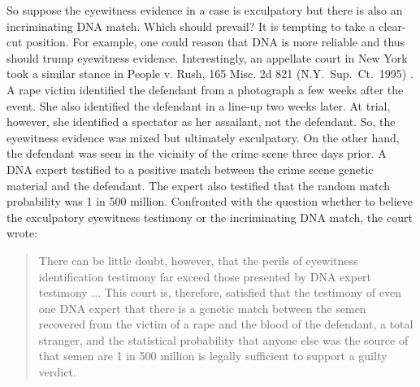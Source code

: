 \documentclass[
  10pt,
  dvipsnames,enabledeprecatedfontcommands]{scrartcl}
\begin{document}
So suppose the eyewitness evidence in a case is exculpatory but there is
also an incriminating DNA match. Which should prevail? It is tempting to
take a clear-cut position. For example, one could reason that DNA is
more reliable and thus should trump eyewitness evidence. Interestingly,
an appellate court in New York took a similar stance in People v. Rush,
165 Misc. 2d 821 (N.Y.~Sup.~Ct.~1995) . A rape victim identified the
defendant from a photograph a few weeks after the event. She also
identified the defendant in a line-up two weeks later. At trial,
however, she identified a spectator as her assailant, not the defendant.
So, the eyewitness evidence was mixed but ultimately exculpatory. On the
other hand, the defendant was seen in the vicinity of the crime scene
three days prior. A DNA expert testified to a positive match between the
crime scene genetic material and the defendant. The expert also
testified that the random match probability was 1 in 500 million.
Confronted with the question whether to believe the exculpatory
eyewitness testimony or the incriminating DNA match, the court wrote:

\begin{quote}
There can be little doubt, however, that the perils of eyewitness identification testimony far exceed those presented by DNA expert testimony ... This court is, therefore, satisfied that the testimony of even one DNA expert that there is a genetic match between the semen recovered from the victim of a rape and the blood of the defendant, a total stranger, and the statistical probability that anyone else was the source of that semen are 1 in 500 million is legally sufficient to support a guilty verdict.
\end{quote}

\noindent
\end{document}
